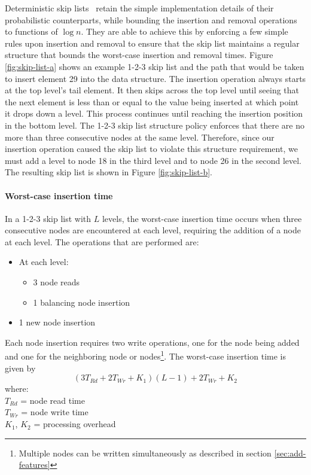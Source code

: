 Deterministic skip lists~\cite{det-skip-list} retain the simple implementation details of their probabilistic counterparts, while bounding the insertion and removal operations to functions of $\log n$. They are able to achieve this by enforcing a few simple rules upon insertion and removal to ensure that the skip list maintains a regular structure that bounds the worst-case insertion and removal times. Figure \ref{fig:skip-list-a} shows an example 1-2-3 skip list and the path that would be taken to insert element 29 into the data structure. The insertion operation always starts at the top level's tail element. It then skips across the top level until seeing that the next element is less than or equal to the value being inserted at which point it drops down a level. This process continues until reaching the insertion position in the bottom level. The 1-2-3 skip list structure policy enforces that there are no more than three consecutive nodes at the same level. Therefore, since our insertion operation caused the skip list to violate this structure requirement, we must add a level to node 18 in the third level and to node 26 in the second level. The resulting skip list is shown in Figure \ref{fig:skip-list-b}.
\paragraph{Worst-case insertion time} 
In a 1-2-3 skip list with $L$ levels, the worst-case insertion time occurs when three consecutive nodes are encountered at each level, requiring the addition of a node at each level.  
The operations that are performed are: 
\begin{itemize}
\item At each level:
\begin{itemize}
\item 3 node reads
\item 1 balancing node insertion
\end{itemize}
\item 1 new node insertion
\end{itemize}
Each node insertion requires two write operations, one for the node being added and one for the neighboring node or nodes\footnote{Multiple nodes can be written simultaneously as described in section \ref{sec:add-features} }.
The worst-case insertion time is given by
\begin{equation}\label{worst-case-insert_eqn}
(3 T_{Rd} + 2 T_{Wr} + K_{1}) (L - 1) + 2 T_{Wr} + K_{2}
\end{equation}
where:\\
\indent $T_{Rd}$ = node read time\\
\indent $T_{Wr}$ = node write time\\
\indent $K_{1}$, $K_{2}$ = processing overhead\\

